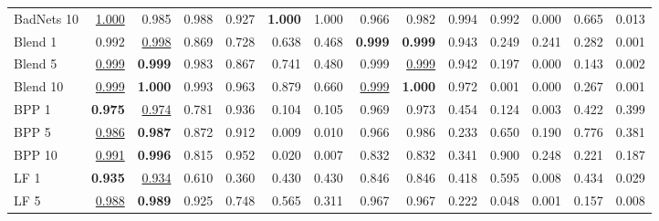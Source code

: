 \begin{table}[htbp]
\begin{adjustbox}{max width=\textwidth}
\begin{tabular}{lrrrrrrrrrrrrr}
BadNets 10 & \underline{1.000} & 0.985 & 0.988 & 0.927 & \textbf{1.000} & 1.000 & 0.966 & 0.982 & 0.994 & 0.992 & \textcolor{black!45}{0.000} & 0.665 & \textcolor{black!45}{0.013} \\
Blend 1 & 0.992 & \underline{0.998} & 0.869 & 0.728 & 0.638 & \textcolor{black!45}{0.468} & \textbf{0.999} & \textbf{0.999} & 0.943 & \textcolor{black!45}{0.249} & \textcolor{black!45}{0.241} & \textcolor{black!45}{0.282} & \textcolor{black!45}{0.001} \\
Blend 5 & \underline{0.999} & \textbf{0.999} & 0.983 & 0.867 & 0.741 & \textcolor{black!45}{0.480} & 0.999 & \underline{0.999} & 0.942 & \textcolor{black!45}{0.197} & \textcolor{black!45}{0.000} & \textcolor{black!45}{0.143} & \textcolor{black!45}{0.002} \\
Blend 10 & \underline{0.999} & \textbf{1.000} & 0.993 & 0.963 & 0.879 & 0.660 & \underline{0.999} & \textbf{1.000} & 0.972 & \textcolor{black!45}{0.001} & \textcolor{black!45}{0.000} & \textcolor{black!45}{0.267} & \textcolor{black!45}{0.001} \\
BPP 1 & \textbf{0.975} & \underline{0.974} & 0.781 & 0.936 & \textcolor{black!45}{0.104} & \textcolor{black!45}{0.105} & 0.969 & 0.973 & \textcolor{black!45}{0.454} & \textcolor{black!45}{0.124} & \textcolor{black!45}{0.003} & \textcolor{black!45}{0.422} & \textcolor{black!45}{0.399} \\
BPP 5 & \underline{0.986} & \textbf{0.987} & 0.872 & 0.912 & \textcolor{black!45}{0.009} & \textcolor{black!45}{0.010} & 0.966 & 0.986 & \textcolor{black!45}{0.233} & 0.650 & \textcolor{black!45}{0.190} & 0.776 & \textcolor{black!45}{0.381} \\
BPP 10 & \underline{0.991} & \textbf{0.996} & 0.815 & 0.952 & \textcolor{black!45}{0.020} & \textcolor{black!45}{0.007} & 0.832 & 0.832 & \textcolor{black!45}{0.341} & 0.900 & \textcolor{black!45}{0.248} & \textcolor{black!45}{0.221} & \textcolor{black!45}{0.187} \\
LF 1 & \textbf{0.935} & \underline{0.934} & 0.610 & \textcolor{black!45}{0.360} & \textcolor{black!45}{0.430} & \textcolor{black!45}{0.430} & 0.846 & 0.846 & \textcolor{black!45}{0.418} & 0.595 & \textcolor{black!45}{0.008} & \textcolor{black!45}{0.434} & \textcolor{black!45}{0.029} \\
LF 5 & \underline{0.988} & \textbf{0.989} & 0.925 & 0.748 & 0.565 & \textcolor{black!45}{0.311} & 0.967 & 0.967 & \textcolor{black!45}{0.222} & \textcolor{black!45}{0.048} & \textcolor{black!45}{0.001} & \textcolor{black!45}{0.157} & \textcolor{black!45}{0.008} \\

\end{tabular}
\end{adjustbox}
\end{table}
